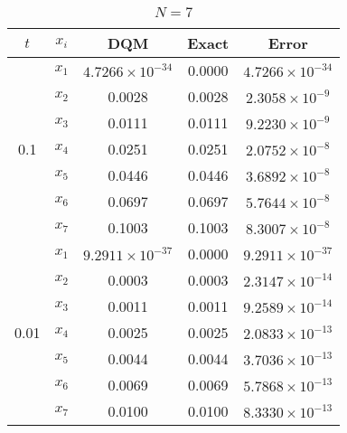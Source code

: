 \begin{solution}
	\begin{table}[ht]
		\centering
		\begin{english}
		\begin{tabular}{|c|c|c|c|c|}
			\hline
			$t$ & $x_i$ & DQM & Exact & Error \\
			\hline
			\multirow{7}{*}{0.1} & $x_1$ & $4.7266 \times 10^{-34}$ & 0.0000 & $4.7266 \times 10^{-34}$ \\
			& $x_2$ & 0.0028 & 0.0028 & $2.3058 \times 10^{-9}$ \\
			& $x_3$ & 0.0111 & 0.0111 & $9.2230 \times 10^{-9}$ \\
			& $x_4$ & 0.0251 & 0.0251 & $2.0752 \times 10^{-8}$ \\
			& $x_5$ & 0.0446 & 0.0446 & $3.6892 \times 10^{-8}$ \\
			& $x_6$ & 0.0697 & 0.0697 & $5.7644 \times 10^{-8}$ \\
			& $x_7$ & 0.1003 & 0.1003 & $8.3007 \times 10^{-8}$ \\
			\hline
			\multirow{7}{*}{0.01} & $x_1$ & $9.2911 \times 10^{-37}$ & 0.0000 & $9.2911 \times 10^{-37}$ \\
			& $x_2$ & 0.0003 & 0.0003 & $2.3147 \times 10^{-14}$ \\
			& $x_3$ & 0.0011 & 0.0011 & $9.2589 \times 10^{-14}$ \\
			& $x_4$ & 0.0025 & 0.0025 & $2.0833 \times 10^{-13}$ \\
			& $x_5$ & 0.0044 & 0.0044 & $3.7036 \times 10^{-13}$ \\
			& $x_6$ & 0.0069 & 0.0069 & $5.7868 \times 10^{-13}$ \\
			& $x_7$ & 0.0100 & 0.0100 & $8.3330 \times 10^{-13}$ \\
			\hline
		\end{tabular}
	\end{english}
		\caption{$N=7$}
		\label{tab:firstexN7}
	\end{table}
\end{solution}


